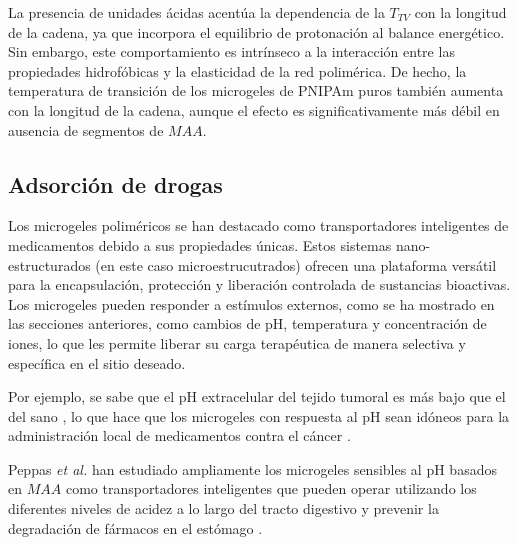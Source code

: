 La presencia de unidades \'acidas acent\'ua la dependencia de la $T_{TV}$ con la longitud de la cadena, ya que incorpora el equilibrio de protonaci\'on al balance energ\'etico. Sin embargo, este comportamiento es intr\'inseco a la interacci\'on entre las propiedades hidrof\'obicas y la elasticidad de la red polim\'erica. De hecho, la temperatura de transici\'on de los microgeles de PNIPAm puros tambi\'en aumenta con la longitud de la cadena, aunque el efecto es significativamente m\'as d\'ebil en ausencia de segmentos de $MAA$.



\subsection{Adsorci\'on de drogas}\label{sec:gel:ads-drogas}


Los microgeles polim\'ericos se han destacado como transportadores inteligentes de medicamentos debido a sus propiedades \'unicas. Estos sistemas nano-estructurados (en este caso microestrucutrados) ofrecen una plataforma vers\'atil para la encapsulaci\'on, protecci\'on y liberaci\'on controlada de sustancias bioactivas. Los microgeles pueden responder a est\'imulos externos, como se ha mostrado en las secciones anteriores,  como cambios de pH, temperatura y concentraci\'on de iones, lo que les permite liberar su carga terap\'eutica de manera selectiva y espec\'ifica en el sitio deseado. 

Por ejemplo, se sabe que el pH extracelular del tejido tumoral es m\'as bajo que el del sano \cite{Gerweck1996}, lo que hace que los microgeles con respuesta al pH sean id\'oneos para la administraci\'on local de medicamentos contra el c\'ancer \cite{Dadsetan2013}.

Peppas \emph{et al.} han estudiado ampliamente los microgeles sensibles al pH basados en $MAA$ como transportadores inteligentes que pueden operar utilizando los diferentes niveles de acidez a lo largo del tracto digestivo y prevenir la degradaci\'on de f\'armacos en el est\'omago \cite{TorresLugo2002, Carr2010, DuranLobato2014, Sharpe2018}.

